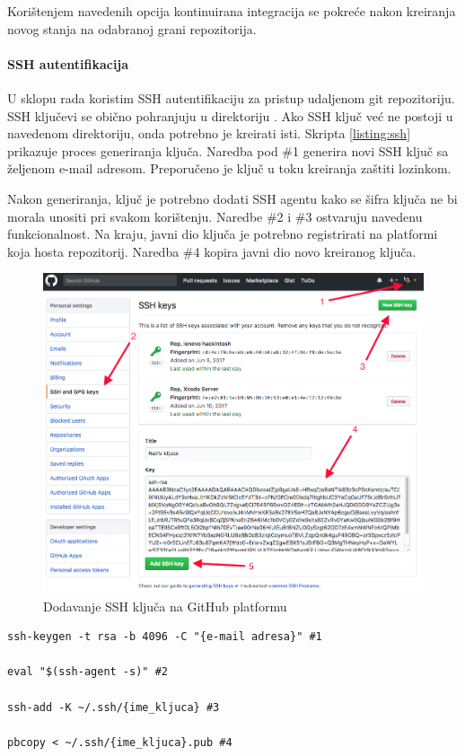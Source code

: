 \documentclass[times, utf8, diplomski, numeric]{fer}
\begin{document}
Korištenjem navedenih opcija kontinuirana integracija se pokreće nakon kreiranja novog stanja na odabranoj grani repozitorija.

\paragraph{SSH autentifikacija}

U sklopu rada koristim SSH autentifikaciju za pristup udaljenom git repozitoriju. SSH ključevi se obično pohranjuju u direktoriju . Ako SSH ključ već ne postoji u navedenom direktoriju, onda potrebno je kreirati isti. Skripta \ref{listing:ssh} prikazuje proces generiranja ključa. Naredba pod \#1 generira novi SSH ključ sa željenom e-mail adresom. Preporučeno je ključ u toku kreiranja zaštiti lozinkom.

Nakon generiranja, ključ je potrebno dodati SSH agentu kako se šifra ključa ne bi morala unositi pri svakom korištenju. Naredbe \#2 i \#3 ostvaruju navedenu funkcionalnost. Na kraju, javni dio ključa je potrebno registrirati na platformi koja hosta repozitorij. Naredba \#4 kopira javni dio novo kreiranog ključa.

\begin{figure}[b!]
\centering
\includegraphics[scale=0.3]{GitHubSSH}
\caption{Dodavanje SSH ključa na GitHub platformu}
\label{fig:GitHubSSH}
\end{figure}

\begin{lstlisting}[caption=Postavljanje SSH autentifikacije, label=listing:ssh]
ssh-keygen -t rsa -b 4096 -C "{e-mail adresa}" #1

eval "$(ssh-agent -s)" #2

ssh-add -K ~/.ssh/{ime_kljuca} #3

pbcopy < ~/.ssh/{ime_kljuca}.pub #4
\end{lstlisting}
\end{document}
